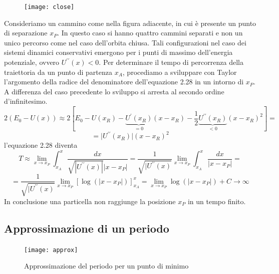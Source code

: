 \begin{figure}
\vspace{-0.3in}
  \begin{center}
    \texttt{[image: close]}
  \end{center}
\end{figure}
\vspace{0.3in}
\noindent Consideriamo un cammino come nella figura adiacente, in cui \`{e} presente un punto di separazione $x_{P}$. In questo caso si hanno quattro cammini separati e non un unico percorso come nel caso dell'orbita chiusa. Tali configurazioni nel caso dei sistemi dinamici conservativi emergono per i punti di massimo dell'energia potenziale, ovvero $U^{\prime \prime}(x) < 0$. Per determinare il tempo di percorrenza della traiettoria da un punto di partenza $x_A$, procediamo a sviluppare con Taylor l'argomento della radice del denominatore dell'equazione 2.28 in un intorno di $x_P$. A differenza del caso precedente lo sviluppo si arresta al secondo ordine d'infinitesimo.
\begin{equation*}
	2(E_0 -U(x)) \approx 2   [ E_0 - U(x_R) -\underbrace{U^{\prime}(x_R)}_{ = 0}(x-x_R) - \frac{1}{2}\underbrace{U^{\prime \prime}(x_R)}_{ < 0}(x-x_R)^2 ] =
\end{equation*} 
\begin{equation*}
	= \vert U^{\prime \prime}(x_R) \vert (x-x_R)^2
\end{equation*}
l'equazione 2.28 diventa 
\begin{equation*}
	T  \approx \lim_{x \rightarrow x_P} \int_{x_A}^{x} \frac{dx}{\sqrt{|U^{\prime \prime}(x)|}|x-x_P|} = \frac{1}{\sqrt{\vert U^{\prime \prime}(x)}} 
	\lim_{x \rightarrow x_P}\int_{x_A}^{x} \frac{dx}{\vert x - x_P \vert} = 
\end{equation*}
\begin{equation*}
	= \frac{1}{\sqrt{\vert U^{\prime \prime}(x)}} 
	\lim_{x \rightarrow x_P}  [ \log(\vert x - x_P \vert ) ]_{x_A}^{x} = \lim_{x \rightarrow x_P} \log(\vert x - x_P \vert) + C \rightarrow \infty 
\end{equation*}
In conclusione una particella non raggiunge la posizione $x_P$ in un tempo finito.

\newpage

\subsection{Approssimazione di un periodo}

 
\begin{figure}[!ht]
\texttt{[image: approx]}	
\centering
\caption{Approssimazione del periodo per un punto di minimo}
\end{figure}

